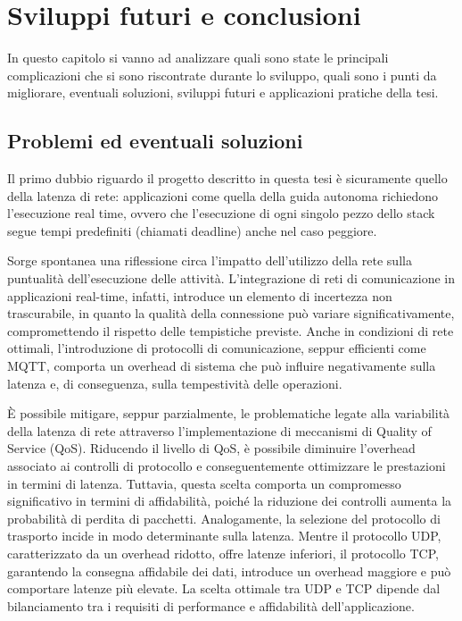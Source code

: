 \section{Sviluppi futuri e conclusioni}
In questo capitolo si vanno ad analizzare quali sono state le principali complicazioni che si sono riscontrate durante lo sviluppo, quali sono i punti da migliorare, eventuali soluzioni, sviluppi futuri e applicazioni pratiche della tesi.

\subsection{Problemi ed eventuali soluzioni}
Il primo dubbio riguardo il progetto descritto in questa tesi è sicuramente quello della latenza di rete: applicazioni come quella della guida autonoma richiedono l'esecuzione real time, ovvero che l'esecuzione di ogni singolo pezzo dello stack segue tempi predefiniti (chiamati deadline) anche nel caso peggiore.  

\noindent Sorge spontanea una riflessione circa l'impatto dell'utilizzo della rete sulla puntualità dell'esecuzione delle attività. L'integrazione di reti di comunicazione in applicazioni real-time, infatti, introduce un elemento di incertezza non trascurabile, in quanto la qualità della connessione può variare significativamente, compromettendo il rispetto delle tempistiche previste. Anche in condizioni di rete ottimali, l'introduzione di protocolli di comunicazione, seppur efficienti come MQTT, comporta un overhead di sistema che può influire negativamente sulla latenza e, di conseguenza, sulla tempestività delle operazioni.

\noindent È possibile mitigare, seppur parzialmente, le problematiche legate alla variabilità della latenza di rete attraverso l'implementazione di meccanismi di Quality of Service (QoS). Riducendo il livello di QoS, è possibile diminuire l'overhead associato ai controlli di protocollo e conseguentemente ottimizzare le prestazioni in termini di latenza. Tuttavia, questa scelta comporta un compromesso significativo in termini di affidabilità, poiché la riduzione dei controlli aumenta la probabilità di perdita di pacchetti. Analogamente, la selezione del protocollo di trasporto incide in modo determinante sulla latenza. Mentre il protocollo UDP, caratterizzato da un overhead ridotto, offre latenze inferiori, il protocollo TCP, garantendo la consegna affidabile dei dati, introduce un overhead maggiore e può comportare latenze più elevate. La scelta ottimale tra UDP e TCP dipende dal bilanciamento tra i requisiti di performance e affidabilità dell'applicazione.

